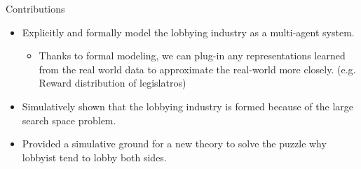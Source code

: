 \documentclass{beamer}
\begin{document}
	\begin{frame}{Contributions}		

		\begin{itemize}
			\item Explicitly and formally model the lobbying industry as a multi-agent system.
			\begin{itemize}
				\item Thanks to formal modeling, we can plug-in any representations learned from the real world data to approximate the real-world more closely. (e.g. Reward distribution of legislatros)
			\end{itemize}
			\item Simulatively shown that the lobbying industry is formed because of the large search space problem.
			\item Provided a simulative ground for a new theory to solve the puzzle why lobbyist tend to lobby both sides.
		\end{itemize}
	\end{frame}
\end{document}
